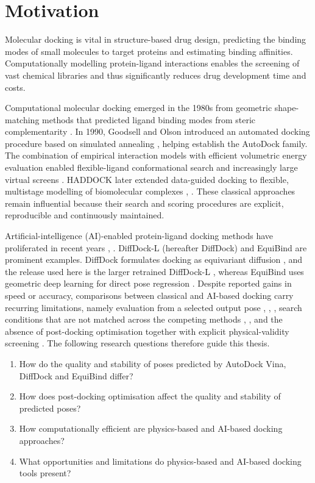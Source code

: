 \hypertarget{motivation}{%
\chapter{\texorpdfstring{Motivation }{Motivation }}\label{motivation}}

Molecular docking is vital in structure-based drug design, predicting the binding modes of small molecules to target proteins and estimating binding affinities. Computationally modelling protein-ligand interactions enables the screening of vast chemical libraries and thus significantly reduces drug development time and costs.

Computational molecular docking emerged in the 1980s from geometric shape-matching methods that predicted ligand binding modes from steric complementarity \cite{ref001}. In 1990, Goodsell and Olson introduced an automated docking procedure based on simulated annealing \cite{ref002}, helping establish the AutoDock family. The combination of empirical interaction models with efficient volumetric energy evaluation enabled flexible-ligand conformational search and increasingly large virtual screens \cite{ref003}. HADDOCK later extended data-guided docking to flexible, multistage modelling of biomolecular complexes \cite{ref004}, \cite{ref005}. These classical approaches remain influential because their search and scoring procedures are explicit, reproducible and continuously maintained.

Artificial-intelligence (AI)-enabled protein-ligand docking methods have proliferated in recent years \cite{ref006}, \cite{ref007}. DiffDock-L (hereafter DiffDock) and EquiBind are prominent examples. DiffDock formulates docking as equivariant diffusion \cite{ref024}, and the release used here is the larger retrained DiffDock-L \cite{ref091}, whereas EquiBind uses geometric deep learning for direct pose regression \cite{ref010}. Despite reported gains in speed or accuracy, comparisons between classical and AI-based docking carry recurring limitations, namely evaluation from a selected output pose \cite{ref012}, \cite{ref013}, \cite{ref035}, search conditions that are not matched across the competing methods \cite{ref011}, \cite{ref035}, and the absence of post-docking optimisation together with explicit physical-validity screening \cite{ref011}. The following research questions therefore guide this thesis.

\begin{enumerate}
\item[\textbf{RQ1}] How do the quality and stability of poses predicted by AutoDock Vina, DiffDock and EquiBind differ?
\item[\textbf{RQ2}] How does post-docking optimisation affect the quality and stability of predicted poses?
\item[\textbf{RQ3}] How computationally efficient are physics-based and AI-based docking approaches?
\item[\textbf{RQ4}] What opportunities and limitations do physics-based and AI-based docking tools present?
\end{enumerate}

